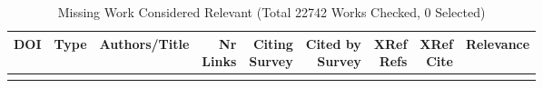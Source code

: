 {\scriptsize
\begin{longtable}{p{5cm}lp{11cm}rrrrrr}
\caption{Missing Work Considered Relevant (Total 22742 Works Checked, 0 Selected)}\\ \toprule
DOI & Type & Authors/Title & \shortstack{Nr\\Links} & \shortstack{Citing\\Survey} & \shortstack{Cited by\\Survey} & \shortstack{XRef\\Refs} & \shortstack{XRef\\Cite} & Relevance\\ \midrule\endhead
\bottomrule
\endfoot
\end{longtable}
}

